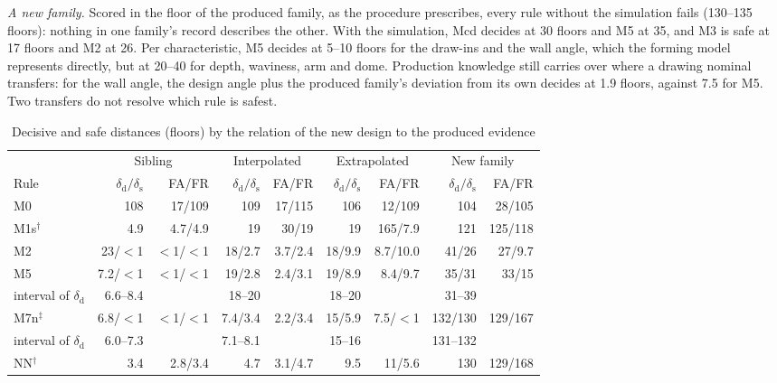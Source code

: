 \documentclass[pdflatex,sn-basic,lineno]{sn-jnl}
\newcommand{\tabsize}{\fontsize{8}{9.5}\selectfont}
\begin{document}
\emph{A new family.} Scored in the floor of the produced family, as the procedure prescribes, every rule without the simulation fails (130--135 floors): nothing in one family's record describes the other. With the simulation, Mcd decides at 30 floors and M5 at 35, and M3 is safe at 17 floors and M2 at 26. Per characteristic, M5 decides at 5--10 floors for the draw-ins and the wall angle, which the forming model represents directly, but at 20--40 for depth, waviness, arm and dome. Production knowledge still carries over where a drawing nominal transfers: for the wall angle, the design angle plus the produced family's deviation from its own decides at 1.9 floors, against 7.5 for M5. Two transfers do not resolve which rule is safest.

\begin{table}[t]
\tabsize
\setlength{\tabcolsep}{3.4pt}
\caption{Decisive and safe distances (floors) by the relation of the new design to the produced evidence}\label{tab:distances}
\begin{tabular}{@{}lrrrrrrrr@{}}
\toprule
 & \multicolumn{2}{c}{Sibling} & \multicolumn{2}{c}{Interpolated} & \multicolumn{2}{c}{Extrapolated} & \multicolumn{2}{c}{New family} \\
\cmidrule(lr){2-3}\cmidrule(lr){4-5}\cmidrule(lr){6-7}\cmidrule(lr){8-9}
Rule & $\delta_\mathrm{d}/\delta_\mathrm{s}$ & FA/FR & $\delta_\mathrm{d}/\delta_\mathrm{s}$ & FA/FR & $\delta_\mathrm{d}/\delta_\mathrm{s}$ & FA/FR & $\delta_\mathrm{d}/\delta_\mathrm{s}$ & FA/FR \\
\midrule
M0 & 108 & 17/109 & 109 & 17/115 & 106 & 12/109 & 104 & 28/105 \\
M1s$^\dagger$ & 4.9 & 4.7/4.9 & 19 & 30/19 & 19 & 165/7.9 & 121 & 125/118 \\
M2 & 23/$<$1 & $<$1/$<$1 & 18/2.7 & 3.7/2.4 & 18/9.9 & 8.7/10.0 & 41/26 & 27/9.7 \\
M5 & 7.2/$<$1 & $<$1/$<$1 & 19/2.8 & 2.4/3.1 & 19/8.9 & 8.4/9.7 & 35/31 & 33/15 \\
\quad interval of $\delta_\mathrm{d}$ & 6.6--8.4 &  & 18--20 &  & 18--20 &  & 31--39 & \\
M7n$^\ddagger$ & 6.8/$<$1 & $<$1/$<$1 & 7.4/3.4 & 2.2/3.4 & 15/5.9 & 7.5/$<$1 & 132/130 & 129/167 \\
\quad interval of $\delta_\mathrm{d}$ & 6.0--7.3 &  & 7.1--8.1 &  & 15--16 &  & 131--132 & \\
NN$^\dagger$ & 3.4 & 2.8/3.4 & 4.7 & 3.1/4.7 & 9.5 & 11/5.6 & 130 & 129/168 \\

\end{tabular}
\end{table}
\end{document}
